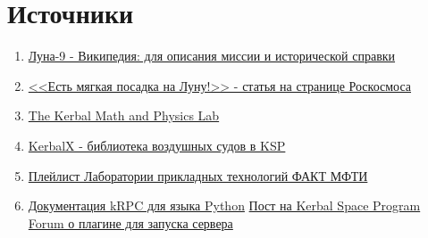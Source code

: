 \section*{Источники}
\begin{enumerate}
	\item \href{https://ru.wikipedia.org/wiki/%D0%9B%D1%83%D0%BD%D0%B0-9}{Луна-9 - Википедия: для описания миссии и исторической справки}
	\item \href{https://www.roscosmos.ru/29868/#1}{<<Есть мягкая посадка на Луну!>> - статья на странице Роскосмоса}
	\item \href{https://sites.google.com/view/kspmath/home}{The Kerbal Math and Physics Lab}
	\item \href{https://kerbalx.com/}{KerbalX - библиотека воздушных судов в KSP}
	\item \href{https://www.youtube.com/playlist?list=PLP3ZxgNn8T5IycT_nu3IgpLHhYrONjzsp}{Плейлист Лаборатории прикладных технологий ФАКТ МФТИ}
	\item \href{https://krpc.github.io/krpc/python/client.html}{Документация kRPC для языка Python}
	\href{https://forum.kerbalspaceprogram.com/index.php?/topic/130742-15x-to-122-krpc-control-the-game-using-c-c-java-lua-python-ruby-haskell-c-arduino-v048-28th-october-2018/}{Пост на Kerbal Space Program Forum о плагине для запуска сервера}
\end{enumerate}

